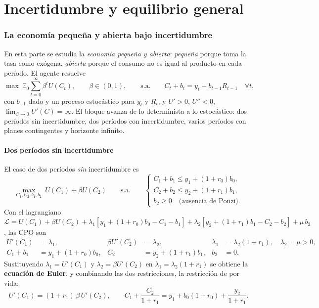 \documentclass[11pt]{article}
\theoremstyle{definition}
\newcommand{\E}{\mathbb{E}}
\begin{document}
\part{Incertidumbre y equilibrio general}

\section{La economía pequeña y abierta bajo incertidumbre}

En esta parte se estudia la \emph{economía pequeña y abierta}: \emph{pequeña} porque toma la tasa como
exógena, \emph{abierta} porque el consumo no es igual al producto en cada período. El agente resuelve
\begin{equation}
\max\ \E_{0}\sum_{t=0}^{\infty}\beta^{t}U(C_{t}),\qquad \beta\in(0,1),
\qquad\text{s.a.}\qquad
C_{t}+b_{t}=y_{t}+b_{t-1}R_{t-1}\quad\forall t,
\end{equation}
con $b_{-1}$ dado y un proceso estocástico para $y_{t}$ y $R_{t}$, y $U'>0$, $U''<0$,
$\lim_{C\to0}U'(C)=\infty$. El bloque avanza de lo determinista a lo estocástico: dos períodos sin
incertidumbre, dos períodos con incertidumbre, varios períodos con planes contingentes y horizonte
infinito.

\subsection{Dos períodos sin incertidumbre}

El caso de dos períodos \emph{sin} incertidumbre es
\begin{equation}
\max_{C_{1},C_{2},b_{1},b_{2}}\ U(C_{1})+\beta U(C_{2})
\qquad\text{s.a.}\qquad
\begin{cases}
C_{1}+b_{1}\le y_{1}+(1+r_{0})b_{0},\\[2pt]
C_{2}+b_{2}\le y_{2}+(1+r_{1})b_{1},\\[2pt]
b_{2}\ge0\quad\text{(ausencia de Ponzi).}
\end{cases}
\end{equation}
Con el lagrangiano
$\mathcal{L}=U(C_{1})+\beta U(C_{2})+\lambda_{1}[y_{1}+(1+r_{0})b_{0}-C_{1}-b_{1}]
+\lambda_{2}[y_{2}+(1+r_{1})b_{1}-C_{2}-b_{2}]+\mu\,b_{2}$, las CPO son
\begin{align}
U'(C_{1})&=\lambda_{1}, & \beta U'(C_{2})&=\lambda_{2}, & \lambda_{1}&=\lambda_{2}(1+r_{1}),\quad \lambda_{2}=\mu>0,\\
C_{1}+b_{1}&=y_{1}+(1+r_{0})b_{0}, & C_{2}&=y_{2}+(1+r_{1})b_{1}, & b_{2}&=0 .
\end{align}
Sustituyendo $\lambda_{1}=U'(C_{1})$ y $\lambda_{2}=\beta U'(C_{2})$ en $\lambda_{1}=\lambda_{2}(1+r_{1})$
se obtiene la \textbf{ecuación de Euler}, y combinando las dos restricciones, la restricción de por
vida:
\begin{equation}
U'(C_{1})=(1+r_{1})\,\beta\,U'(C_{2}),
\qquad
C_{1}+\frac{C_{2}}{1+r_{1}}=y_{1}+b_{0}(1+r_{0})+\frac{y_{2}}{1+r_{1}} .
\end{equation}
\end{document}
